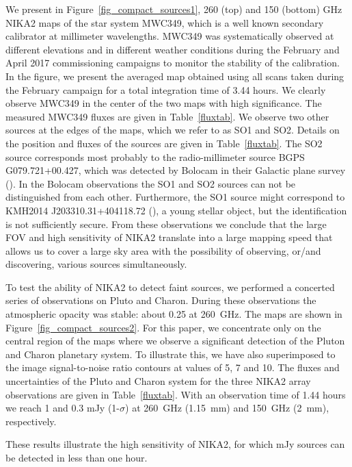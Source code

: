 \documentclass[]{aa} %
\begin{document}
We present in Figure~\ref{fig_compact_sources1}, 260 (top) and 150 (bottom) GHz NIKA2 maps of the star system MWC349, which is a well known secondary calibrator at millimeter wavelengths. MWC349 was systematically observed at different elevations and in different weather conditions during the February and April 2017 commissioning campaigns to monitor the stability of the calibration. In the figure, we present the averaged map obtained using all scans taken during the February campaign for a total integration time of 3.44 hours. We clearly observe MWC349 in the center of the two maps with high significance. The measured MWC349 fluxes are given in Table~\ref{fluxtab}. We observe two other sources at the edges of the maps, which we refer to as SO1 and SO2. Details on the position and fluxes of the sources are given in Table~\ref{fluxtab}. The SO2 source corresponds most probably to the radio-millimeter source BGPS G079.721+00.427, which was detected by Bolocam in their Galactic plane survey (\cite{Rosolowsky2010}). In the Bolocam observations the SO1 and SO2 sources can not be distinguished from each other. Furthermore, the SO1 source might correspond to  KMH2014 J203310.31+404118.72 (\cite{Kryukova2014}), a young stellar object, but the identification is not sufficiently secure.
From these observations we conclude that the large FOV and high sensitivity of NIKA2 translate into a large mapping speed that allows us to cover a large sky area with the possibility of observing, or/and discovering, various sources simultaneously. 

To test the ability of NIKA2 to detect faint sources, we performed a concerted series of observations on Pluto and Charon.
During these observations the atmospheric opacity was stable: about 0.25 at 260~GHz. The maps are shown in Figure~\ref{fig_compact_sources2}. For this paper, we concentrate only on the central region of the maps where we observe a significant detection of the Pluton and Charon planetary system. To illustrate this, we have also superimposed to the image signal-to-noise ratio contours at values of 5, 7 and 10. The fluxes and uncertainties of the Pluto and Charon system for the three NIKA2 array observations are given in Table~\ref{fluxtab}. With an observation time of 1.44 hours we reach 1 and 0.3 mJy (1-$\sigma$) at 260~GHz (1.15~mm) and 150~GHz (2~mm), respectively.

These results illustrate the high sensitivity of NIKA2, for which mJy sources can be detected in less than one hour.
\end{document}
